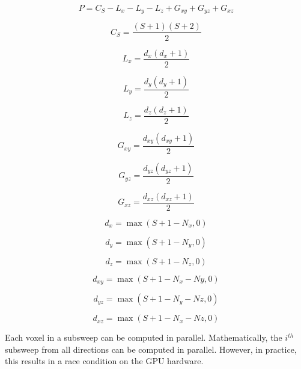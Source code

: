 \begin{equation}\label{eq:taskspersub}
P = C_S - L_x - L_y - L_z + G_{xy} + G_{yz} + G_{xz}
\end{equation}

\begin{equation}
C_S = \frac{(S+1)(S+2)}{2}
\end{equation}

\begin{equation}
L_x = \frac{d_x(d_x+1)}{2}
\end{equation}

\begin{equation}
L_y = \frac{d_y(d_y+1)}{2}
\end{equation}

\begin{equation}
L_z = \frac{d_z(d_z+1)}{2}
\end{equation}

\begin{equation}
G_{xy} = \frac{d_{xy}(d_{xy}+1)}{2}
\end{equation}

\begin{equation}
G_{yz} = \frac{d_{yz}(d_{yz}+1)}{2}
\end{equation}

\begin{equation}
G_{xz} = \frac{d_{xz}(d_{xz}+1)}{2}
\end{equation}

\begin{equation}
d_x = \max(S+1-N_x, 0)
\end{equation}

\begin{equation}
d_y = \max(S+1-N_y, 0)
\end{equation}

\begin{equation}
d_z = \max(S+1-N_z, 0)
\end{equation}

\begin{equation}
d_{xy} = \max(S+1-N_x - Ny, 0)
\end{equation}

\begin{equation}
d_{yz} = \max(S+1-N_y - Nz, 0)
\end{equation}

\begin{equation}
d_{xz} = \max(S+1-N_x - Nz, 0)
\end{equation}

Each voxel in a subsweep can be computed in parallel. Mathematically, the $i^{th}$ subsweep from all directions can be computed in parallel. However, in practice, this results in a race condition on the GPU hardware.


